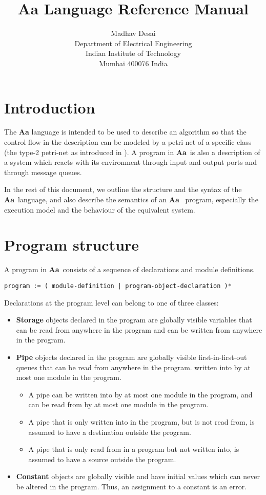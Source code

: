 \documentclass{article}
\title{Aa Language Reference Manual}
\author{Madhav Desai \\ Department of Electrical Engineering \\ Indian Institute of Technology \\
	Mumbai 400076 India}
\newcommand{\Aa}{{\bf Aa}~}
\begin{document}
\maketitle

\section{Introduction}

The {\bf Aa} language is intended to be used to
describe an algorithm so that the control flow
in the description can be modeled by a petri net
of a specific class (the type-2 petri-net as
introduced in \cite{ref:SameerPhD}).  A program in
\Aa is also a description of a system which reacts with 
its environment through input and output ports and 
through message queues.

In the rest of this document, we outline the
structure and the syntax of the \Aa language,
and also describe the semantics of an \Aa
program, especially the execution model and
the behaviour of the equivalent system.


\section{Program structure}


A program in \Aa consists of a sequence of
declarations and module definitions.  
\begin{verbatim}
program := ( module-definition | program-object-declaration )*
\end{verbatim}
Declarations at the program level 
can belong to one of three classes:
\begin{itemize}
\item {\bf Storage} objects declared in the program
are globally visible variables that can be read from
anywhere in the program and can be written from anywhere
in the program.
\item {\bf Pipe} objects declared in the program are
globally visible first-in-first-out queues that can 
be read from anywhere in the program. 
written into by at most one module in the program.
\begin{itemize}
\item A pipe can be written into by at most one module
in the program, and can be read from by at most one module
in the program.
\item A pipe that is only written into in the program, but
is not read from, is assumed to have a destination outside
the program.
\item A pipe that is only read from in a program but not
written into, is assumed to have a source outside the program.
\end{itemize}
\item {\bf Constant} objects are globally visible and have
initial values which can never be altered in the program.
Thus, an assignment to a constant is an error.
\end{itemize} 
\end{document}
